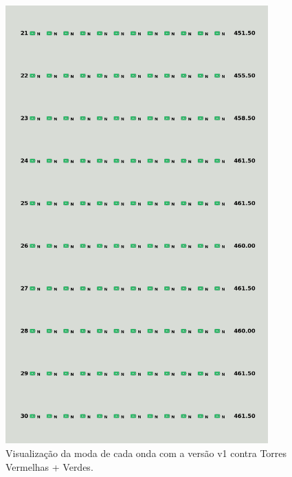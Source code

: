\begin{figure}[H]
  \centering
  \includegraphics[width=0.9\textwidth]{figuras/td/td_redgreen_ai_mode_1_3.png}
  \caption{Visualização da moda de cada onda com a versão v1 contra Torres Vermelhas + Verdes.}
  \label{fig:td-moda-redgreen-1-3}
\end{figure}
